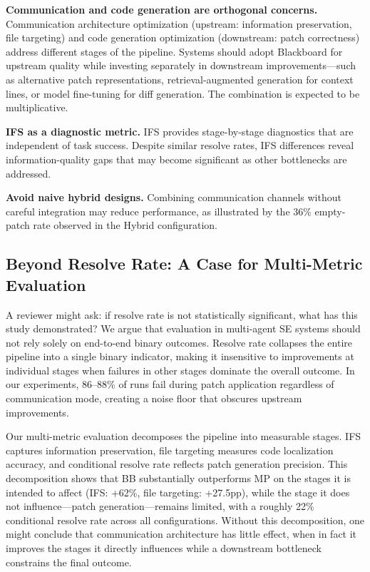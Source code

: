 \documentclass{ieeeaccess}
\begin{document}
\textbf{Communication and code generation are orthogonal concerns.} Communication architecture optimization (upstream: information preservation, file targeting) and code generation optimization (downstream: patch correctness) address different stages of the pipeline. Systems should adopt Blackboard for upstream quality while investing separately in downstream improvements---such as alternative patch representations, retrieval-augmented generation \cite{lewis2020retrieval} for context lines, or model fine-tuning for diff generation. The combination is expected to be multiplicative.

\textbf{IFS as a diagnostic metric.} IFS provides stage-by-stage diagnostics that are independent of task success. Despite similar resolve rates, IFS differences reveal information-quality gaps that may become significant as other bottlenecks are addressed.

\textbf{Avoid naive hybrid designs.} Combining communication channels without careful integration may reduce performance, as illustrated by the 36\% empty-patch rate observed in the Hybrid configuration.

\subsection{Beyond Resolve Rate: A Case for Multi-Metric Evaluation}

A reviewer might ask: if resolve rate is not statistically significant, what has this study demonstrated? We argue that evaluation in multi-agent SE systems should not rely solely on end-to-end binary outcomes. Resolve rate collapses the entire pipeline into a single binary indicator, making it insensitive to improvements at individual stages when failures in other stages dominate the overall outcome. In our experiments, 86--88\% of runs fail during patch application regardless of communication mode, creating a noise floor that obscures upstream improvements.

Our multi-metric evaluation decomposes the pipeline into measurable stages. IFS captures information preservation, file targeting measures code localization accuracy, and conditional resolve rate reflects patch generation precision. This decomposition shows that BB substantially outperforms MP on the stages it is intended to affect (IFS: +62\%, file targeting: +27.5pp), while the stage it does not influence---patch generation---remains limited, with a roughly 22\% conditional resolve rate across all configurations. Without this decomposition, one might conclude that communication architecture has little effect, when in fact it improves the stages it directly influences while a downstream bottleneck constrains the final outcome.
\end{document}
